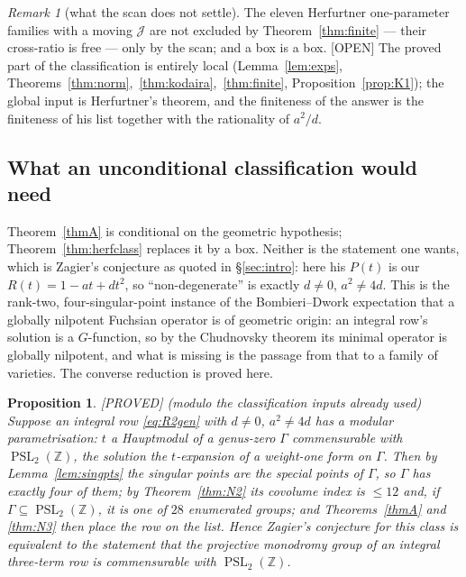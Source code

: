 \documentclass[11pt,reqno]{amsart}
\theoremstyle{plain}
\newtheorem{proposition}[theorem]{Proposition}
\theoremstyle{definition}
\theoremstyle{remark}
\newtheorem{remark}[theorem]{Remark}
\theoremstyle{plain}
\newcommand{\Z}{\mathbb{Z}}
\DeclareMathOperator{\PSL}{PSL}
\newcommand{\Proved}{\textup{\textsf{[PROVED]}}}
\newcommand{\Open}{\textup{\textsf{[OPEN]}}}
\begin{document}
\begin{remark}[what the scan does not settle]
The eleven Herfurtner one-parameter families with a moving $\mathcal J$ are not
excluded by Theorem~\ref{thm:finite} --- their cross-ratio is free --- only by the
scan; and a box is a box. \Open{} The proved part of the classification is
entirely local (Lemma~\ref{lem:exps},
Theorems~\ref{thm:norm},~\ref{thm:kodaira},~\ref{thm:finite},
Proposition~\ref{prop:K1}); the global input is Herfurtner's theorem, and the
finiteness of the answer is the finiteness of his list together with the
rationality of $a^2/d$.
\end{remark}

\subsection{What an unconditional classification would need}\label{sec:BD}

Theorem~\ref{thmA} is conditional on the geometric hypothesis;
Theorem~\ref{thm:herfclass} replaces it by a box. Neither is the statement one
wants, which is Zagier's conjecture as quoted in \S\ref{sec:intro}: here his
$P(t)$ is our $R(t)=1-at+dt^2$, so ``non-degenerate'' is exactly $d\ne0$,
$a^2\ne4d$. This is the rank-two, four-singular-point instance of the
Bombieri--Dwork expectation \cite{Bombieri1981} that a globally nilpotent
Fuchsian operator is of geometric origin: an integral row's solution is a
$G$-function, so by the Chudnovsky theorem \cite{Chudnovsky1985} its minimal
operator is globally nilpotent, and what is missing is the passage from that to a
family of varieties. The converse reduction is proved here.

\begin{proposition}\label{prop:reduction}
\Proved{} \textup{(}modulo the classification inputs already used\textup{)}
Suppose an integral row \eqref{eq:R2gen} with $d\ne0$, $a^2\ne4d$ has a modular
parametrisation: $t$ a Hauptmodul of a genus-zero $\Gamma$ commensurable with
$\PSL_2(\Z)$, the solution the $t$-expansion of a weight-one form on $\Gamma$.
Then by Lemma~\ref{lem:singpts} the singular points are the special points of
$\Gamma$, so $\Gamma$ has exactly four of them; by Theorem~\ref{thm:N2} its
covolume index is $\le12$ and, if $\Gamma\subseteq\PSL_2(\Z)$, it is one of $28$
enumerated groups; and Theorems~\ref{thmA} and \ref{thm:N3} then place the row on
the list. Hence \emph{Zagier's conjecture for this class is equivalent to the
statement that the projective monodromy group of an integral three-term row is
commensurable with $\PSL_2(\Z)$.}
\end{proposition}
\end{document}
